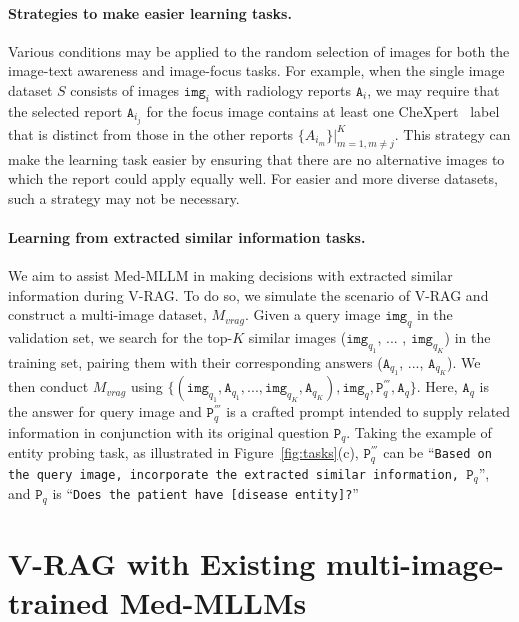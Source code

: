 \paragraph{Strategies to make easier learning tasks.}
Various conditions may be applied to the random selection of images for both the image-text awareness and image-focus tasks.
For example, when the single image dataset $S$ consists of images $\texttt{img}_i$ with radiology reports $\texttt{A}_i$, we may require that the selected report $\texttt{A}_{i_j}$ for the focus image contains at least one CheXpert~\cite{Irvin2019CheXpertAL} label that is distinct from those in the other reports $\{A_{{i_m}}\}|^{K}_{m = 1, m \neq j}$.
This strategy can make the learning task easier by ensuring that there are no alternative images to which the report could apply equally well.
For easier and more diverse datasets, such a strategy may not be necessary.


\paragraph{Learning from extracted similar information tasks.}
We aim to assist Med-MLLM in making decisions with extracted similar information during V-RAG. To do so, we simulate the scenario of V-RAG and construct a multi-image dataset, $M_{vrag}$.
Given a query image $\texttt{img}_{q}$ in the validation set, we search for the top-$K$ similar images ($\texttt{img}_{q_1}$, ... , $\texttt{img}_{q_K}$) in the training set, pairing them with their corresponding answers ($\texttt{A}_{q_1}$, ..., $\texttt{A}_{q_K}$).
We then conduct $M_{vrag}$ using $\{(\texttt{img}_{q_1},  \texttt{A}_{q_1}, ..., \texttt{img}_{q_K}, \texttt{A}_{q_K}), \texttt{img}_{q}, \texttt{P}^{'''}_{q}, \texttt{A}_{q}\}$.
Here, $ \texttt{A}_{q}$ is the answer for query image and $\texttt{P}^{'''}_{q}$ is a crafted prompt intended to supply related information in conjunction with its original question $\texttt{P}_{q}$.
Taking the example of entity probing task, as illustrated in Figure~\ref{fig:tasks}(c), $\texttt{P}^{'''}_{q}$ can be ``\texttt{Based on the query image, incorporate the extracted similar information, $\texttt{P}_{q}$}'', and $\texttt{P}_{q}$ is ``\texttt{Does the patient have [disease entity]?}''






\section{V-RAG with Existing multi-image-trained Med-MLLMs}


